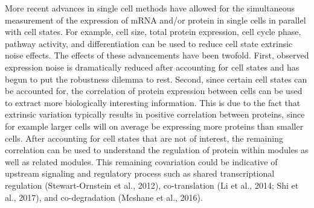 More recent advances in single cell methods have allowed for the simultaneous measurement of the expression of mRNA and/or protein in single cells in parallel with cell states. For example, cell size, total protein expression, cell cycle phase, pathway activity, and differentiation can be used to reduce cell state extrinsic noise effects. The effects of these advancements have been twofold. First, observed expression noise is dramatically reduced after accounting for cell states and has begun to put the robustness dilemma to rest. Second, since certain cell states can be accounted for, the correlation of protein expression between cells can be used to extract more biologically interesting information. This is due to the fact that extrinsic variation typically results in positive correlation between proteins, since for example larger cells will on average be expressing more proteins than smaller cells. After accounting for cell states that are not of interest, the remaining correlation can be used to understand the regulation of protein within modules as well as related modules. This remaining covariation could be indicative of upstream signaling and regulatory process such as shared transcriptional regulation (Stewart-Ornstein et al., 2012), co-translation (Li et al., 2014; Shi et al., 2017), and co-degradation (Mcshane et al., 2016). 
